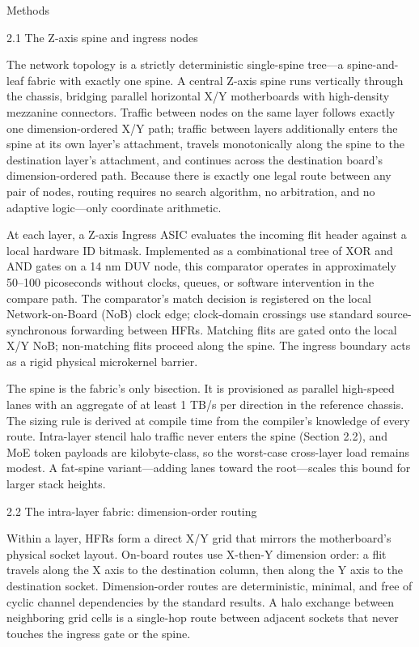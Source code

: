 \documentclass[10pt,twocolumn]{article}
\begin{document}
Methods

2.1 The Z-axis spine and ingress nodes

The network topology is a strictly deterministic single-spine tree---a spine-and-leaf fabric with exactly one spine. A central Z-axis spine runs vertically through the chassis, bridging parallel horizontal X/Y motherboards with high-density mezzanine connectors. Traffic between nodes on the same layer follows exactly one dimension-ordered X/Y path; traffic between layers additionally enters the spine at its own layer's attachment, travels monotonically along the spine to the destination layer's attachment, and continues across the destination board's dimension-ordered path. Because there is exactly one legal route between any pair of nodes, routing requires no search algorithm, no arbitration, and no adaptive logic---only coordinate arithmetic.

At each layer, a Z-axis Ingress ASIC evaluates the incoming flit header against a local hardware ID bitmask. Implemented as a combinational tree of XOR and AND gates on a 14 nm DUV node, this comparator operates in approximately 50--100 picoseconds without clocks, queues, or software intervention in the compare path. The comparator's match decision is registered on the local Network-on-Board (NoB) clock edge; clock-domain crossings use standard source-synchronous forwarding between HFRs. Matching flits are gated onto the local X/Y NoB; non-matching flits proceed along the spine. The ingress boundary acts as a rigid physical microkernel barrier\cite{9}.

The spine is the fabric's only bisection. It is provisioned as parallel high-speed lanes with an aggregate of at least 1 TB/s per direction in the reference chassis. The sizing rule is derived at compile time from the compiler's knowledge of every route. Intra-layer stencil halo traffic never enters the spine (Section 2.2), and MoE token payloads are kilobyte-class, so the worst-case cross-layer load remains modest. A fat-spine variant---adding lanes toward the root---scales this bound for larger stack heights.

2.2 The intra-layer fabric: dimension-order routing

Within a layer, HFRs form a direct X/Y grid that mirrors the motherboard's physical socket layout. On-board routes use X-then-Y dimension order: a flit travels along the X axis to the destination column, then along the Y axis to the destination socket\cite{13,14}. Dimension-order routes are deterministic, minimal, and free of cyclic channel dependencies by the standard results. A halo exchange between neighboring grid cells is a single-hop route between adjacent sockets that never touches the ingress gate or the spine.
\end{document}
